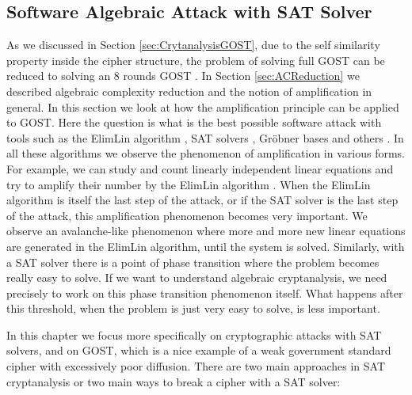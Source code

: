\subsection{Software Algebraic Attack with SAT Solver} \label{sec:SoftAlgAttackSAT}
As we discussed in Section \ref{sec:CrytanalysisGOST}, due to the self similarity property inside the cipher structure, the problem of solving full GOST can be reduced to solving an 8 rounds GOST \cite{gostac}. In Section \ref{sec:ACReduction} we described algebraic complexity reduction and the notion of amplification in general. In this section we look at how the amplification principle can be applied to GOST. Here the question is what is the best possible software attack with tools such as the ElimLin algorithm \cite{AlgSnowCourtoisDebraize,DEScourtois,ElimLinR}, SAT solvers \cite{OptimiPaper,BardCourtoiJeffersonConv}, Gr\"{o}bner bases \cite{grobner} and others \cite{SemaevSparseJournalPaper}. In all these algorithms we observe the phenomenon of amplification in various forms. For example, we can study and count linearly independent linear equations and try to amplify their number
by the ElimLin algorithm \cite{AlgSnowCourtoisDebraize,DEScourtois,ElimLinR}.
When the ElimLin algorithm is itself the last step of the attack, or if the SAT solver is the last step of the attack, this amplification phenomenon becomes very important. We observe an avalanche-like phenomenon where more and more new linear equations are generated in the ElimLin algorithm, until the system is solved. Similarly, with a SAT solver there is a point of phase transition
where the problem becomes really easy to solve. If we want to understand algebraic cryptanalysis, we need precisely to work
on this phase transition phenomenon itself. What happens after this threshold, when the problem is just very easy to solve,
is less important.

In this chapter we focus more specifically on cryptographic attacks with SAT solvers, and on GOST, which is a nice example
of a weak government standard cipher with excessively poor diffusion. There are two main approaches in SAT cryptanalysis
or two main ways to break a cipher with a SAT solver:

